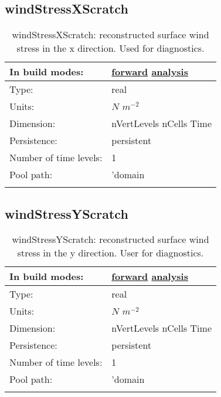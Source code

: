 \subsection[windStressXScratch]{windStressXScratch}
\label{subsec:var_sec_scratch_windStressXScratch}
\begin{center}
\begin{longtable}{| p{2.0in} | p{4.0in} |}
        \hline 
        In build modes: & \hyperref[subsec:forward_var_tab_scratch]{forward} \hyperref[subsec:analysis_var_tab_scratch]{analysis} \\
        \hline 
        Type: & real \\
        \hline 
        Units: & $N$ $m^{-2}$ \\
        \hline 
        Dimension: & nVertLevels nCells Time \\
        \hline 
        Persistence: & persistent \\
        \hline 
        Number of time levels: & 1 \\
        \hline 
            Pool path: & 'domain %
 \\
		 \hline 
    \caption{windStressXScratch: reconstructed surface wind stress in the x direction. Used for diagnostics.}
\end{longtable}
\end{center}
\subsection[windStressYScratch]{windStressYScratch}
\label{subsec:var_sec_scratch_windStressYScratch}
\begin{center}
\begin{longtable}{| p{2.0in} | p{4.0in} |}
        \hline 
        In build modes: & \hyperref[subsec:forward_var_tab_scratch]{forward} \hyperref[subsec:analysis_var_tab_scratch]{analysis} \\
        \hline 
        Type: & real \\
        \hline 
        Units: & $N$ $m^{-2}$ \\
        \hline 
        Dimension: & nVertLevels nCells Time \\
        \hline 
        Persistence: & persistent \\
        \hline 
        Number of time levels: & 1 \\
        \hline 
            Pool path: & 'domain %
 \\
		 \hline 
    \caption{windStressYScratch: reconstructed surface wind stress in the y direction. User for diagnostics.}
\end{longtable}
\end{center}

